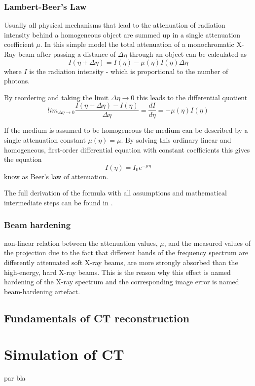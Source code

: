 \subsection{Lambert-Beer's Law\cite{buzug}}
\par Usually all physical mechanisms that lead to the attenuation of radiation intensity behind a homogeneous object are summed up in a single attenuation coefficient \(\mu\). In this simple model the total attenuation of a monochromatic X-Ray beam after passing a distance of \(\Delta\eta\) through an object can be calculated as \[I(\eta + \Delta\eta) = I(\eta) - \mu(\eta)I(\eta)\Delta\eta \] where \(I\) is the radiation intensity - which is proportional to the number of photons.
\par By reordering and taking the limit \(\Delta\eta \rightarrow 0\) this leads to the differential quotient\[lim_{\Delta\eta\rightarrow 0} \frac{I(\eta + \Delta\eta) - I(\eta)}{\Delta\eta} = \frac{dI}{d\eta} = -\mu(\eta)I(\eta)\]
\par If the medium is assumed to be homogeneous the medium can be described by a single attenuation constant \(\mu(\eta) = \mu\). By solving this ordinary linear and homogeneous, first-order
differential equation with constant coefficients this gives the equation \[I(\eta) = I_{0}e^{-\mu\eta}\] know as Beer's law of attenuation.
\par The full derivation of the formula with all assumptions and mathematical intermediate steps can be found in \cite{buzug}.
\subsection{Beam hardening}
\par non-linear relation between the attenuation values, \(\mu\), and the measured values of the projection
due to the fact that different bands of the frequency spectrum are differently attenuated
soft X-ray beams, are more strongly absorbed than the high-energy, hard X-ray beams. This is the reason why this effect is named hardening of the X-ray spectrum and the corresponding image error is named beam-hardening artefact.\cite{buzug}
\section{Fundamentals of CT reconstruction}

\chapter{Simulation of CT}
par bla\cite{deMan}
